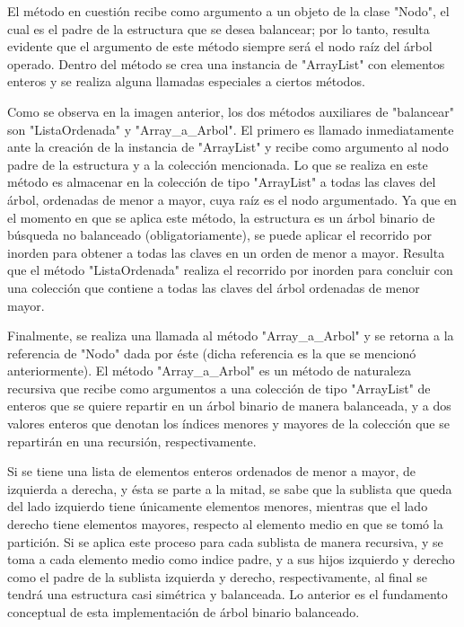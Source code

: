 \documentclass[letterpaper, 11pt]{article}
\begin{document}
	 El método en cuestión recibe como argumento a un objeto de la clase "Nodo", el cual es el padre de la estructura que se desea balancear; por lo tanto, resulta evidente que el argumento de este método siempre será el nodo raíz del árbol operado. Dentro del método se crea una instancia de "ArrayList" con elementos enteros y se realiza alguna llamadas especiales a ciertos métodos.
	 
	 Como se observa en la imagen anterior, los dos métodos auxiliares de "balancear" son "ListaOrdenada" y "Array\_a\_Arbol". El primero es llamado inmediatamente ante la creación de la instancia de "ArrayList" y recibe como argumento al nodo padre de la estructura y a la colección mencionada. Lo que se realiza en este método es almacenar en la colección de tipo "ArrayList" a todas las claves del árbol, ordenadas de menor a mayor, cuya raíz es el nodo argumentado. Ya que en el momento en que se aplica este método, la estructura es un árbol binario de búsqueda no balanceado (obligatoriamente), se puede aplicar el recorrido por inorden para obtener a todas las claves en un orden de menor a mayor. Resulta que el método "ListaOrdenada" realiza el recorrido por inorden para concluir con una colección que contiene a todas las claves del árbol ordenadas de menor mayor.
	 
	 Finalmente, se realiza una llamada al método "Array\_a\_Arbol" y se retorna a la referencia de "Nodo" dada por éste (dicha referencia es la que se mencionó anteriormente). El método "Array\_a\_Arbol" es un método de naturaleza recursiva que recibe como argumentos a una colección de tipo "ArrayList" de enteros que se quiere repartir en un árbol binario de manera balanceada, y a dos valores enteros que denotan los índices menores y mayores de la colección que se repartirán en una recursión, respectivamente. 
	 
	 Si se tiene una lista de elementos enteros ordenados de menor a mayor, de izquierda a derecha, y ésta se parte a la mitad, se sabe que la sublista que queda del lado izquierdo tiene únicamente elementos menores, mientras que el lado derecho tiene elementos mayores, respecto al elemento medio en que se tomó la partición. Si se aplica este proceso para cada sublista de manera recursiva, y se toma a cada elemento medio como indice padre, y a sus hijos izquierdo y derecho como el padre de la sublista izquierda y derecho, respectivamente, al final se tendrá una estructura casi simétrica y balanceada. Lo anterior es el fundamento conceptual de esta implementación de árbol binario balanceado.
	 
\end{document}

